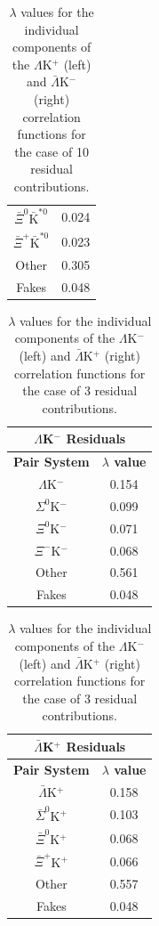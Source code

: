 \documentclass[../AnalysisNoteJBuxton.tex]{subfiles}
\begin{document}
\begin{table}[htbp]
\begin{minipage}{0.3\textwidth}
\begin{tabular}{|c|c|}
   $\bar{\Xi}^{0}\bar{\mathrm{K}}^{*0}$ & 0.024 \\
   $\bar{\Xi}^{+}\bar{\mathrm{K}}^{*0}$ & 0.023 \\
   Other & 0.305 \\
   Fakes & 0.048 \\
   \hline
  \end{tabular}
 \end{minipage} 
 \caption{$\lambda$ values for the individual components of the $\Lambda$K$^{+}$ (left) and $\bar{\Lambda}$K$^{-}$ (right) correlation functions for the case of 10 residual contributions.}
 \label{tab:LambdaValues_10Res_LamKchP}
\end{table}



\clearpage
\begin{table}[htbp]
 \centering
 \begin{minipage}{0.3\textwidth}
  \centering
  \begin{tabular}{|c|c|}
   \multicolumn{2}{c}{$\Lambda$K$^{-}$ Residuals} \\
   \hline
   \textbf{Pair System} & \textbf{$\lambda$ value} \\
   \hline
   $\Lambda$K$^{-}$ & 0.154 \\
   $\Sigma^{0}$K$^{-}$ & 0.099 \\
   $\Xi^{0}$K$^{-}$ & 0.071 \\
   $\Xi^{-}$K$^{-}$ & 0.068 \\
   Other & 0.561 \\
   Fakes & 0.048 \\
   \hline
  \end{tabular}
 \end{minipage}
 \begin{minipage}{0.3\textwidth}
  \centering
  \begin{tabular}{|c|c|}
   \multicolumn{2}{c}{$\bar{\Lambda}$K$^{+}$ Residuals} \\
   \hline
   \textbf{Pair System} & \textbf{$\lambda$ value} \\
   \hline
   $\bar{\Lambda}$K$^{+}$ & 0.158 \\
   $\bar{\Sigma}^{0}$K$^{+}$ & 0.103 \\
   $\bar{\Xi}^{0}$K$^{+}$ & 0.068 \\
   $\bar{\Xi}^{+}$K$^{+}$ & 0.066 \\
   Other & 0.557 \\
   Fakes & 0.048 \\
   \hline
  \end{tabular}
 \end{minipage} 
 \caption{$\lambda$ values for the individual components of the $\Lambda$K$^{-}$ (left) and $\bar{\Lambda}$K$^{+}$ (right) correlation functions for the case of 3 residual contributions.}
 \label{tab:LambdaValues_3Res_LamKchM}
\end{table}
\end{document}
